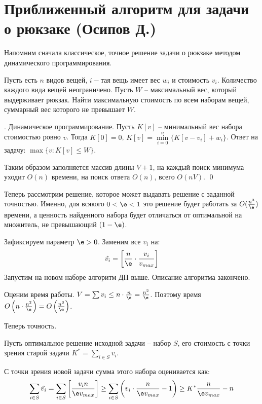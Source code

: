 \section{Приближенный алгоритм для задачи о рюкзаке (Осипов Д.)} 
Напомним сначала классическое, точное решение задачи о рюкзаке методом динамического программирования.

 Пусть есть $n$ видов вещей, $i-$тая вещь имеет вес $w_i$ и стоимость $v_i$. Количество каждого вида вещей неограничено. Пусть $W$ -- максимальный вес, который выдерживает рюкзак. Найти максимальную стоимость по всем наборам вещей, суммарный вес которого не превышает $W$.

. Динамическое программирование. Пусть $K[v]$ -- минимальный вес набора стоимостью ровно $v$. Тогда $K[0] = 0$, $K[v] = \underset{i=0}{\overset{n}{\min}} \{K[v-v_i] + w_i\}$. Ответ на задачу: $\max\{v : K[v] \leq W\}$. 

Таким образом заполняется массив длины $V+1$, на каждый поиск минимума уходит $O(n)$ времени, на поиск ответа $O(n)$, всего $O(nV)$.  \qed

Теперь рассмотрим решение, которое может выдавать решение с заданной точностью. Именно, для всякого $0 < \e < 1$ это решение будет работать за $O(\frac{n^3}{\e})$ времени, а ценность найденного набора будет отличаться от оптимальной на множитель, не превышающий $(1-\e)$.


Зафиксируем параметр $\e>0$. Заменим все $v_i$ на: $$\hat{v_i} = \left[\frac{n}{\e} \cdot \frac{v_i}{v_{max}}\right]$$ Запустим на новом наборе алгоритм ДП выше. Описание алгоритма закончено.

Оценим время работы. $V = \sum v_i \leq n\cdot \frac{n}{\e} = \frac{n^2}{\e}$. Поэтому время $O\left(n \cdot \frac{n^2}{\e}\right) = O\left(\frac{n^3}{\e}\right)$.

Теперь точность. 

Пусть оптимальное решение исходной задачи -- набор $S$, его стоимость с точки зрения старой задачи $K^* = \sum\limits_{i\in S} v_i$.

С точки зрения новой задачи сумма этого набора оценивается как: 
$$\sum_{i\in S}\hat{v_i} = \sum_{i\in S} \left[\frac{v_i n}{\e v_{max}}\right] \geq \sum_{i\in S} \left(v_i \cdot \frac{n}{\e v_{max}} - 1\right) \geq K^*\frac{n}{\e v_{max}} - n$$

